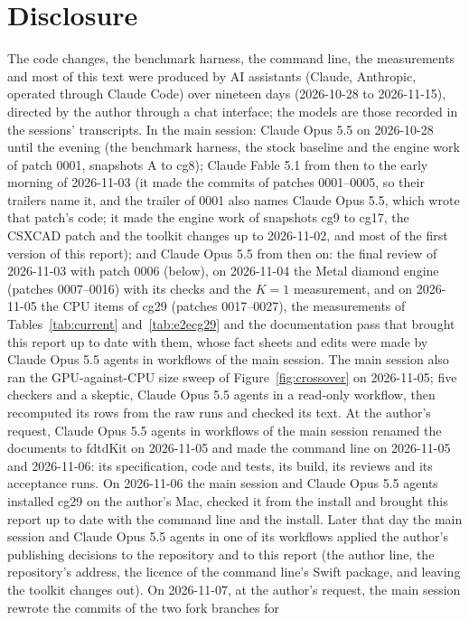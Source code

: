 \section{Disclosure}\label{sec:disclosure}
The code changes, the benchmark harness, the command line, the measurements and most of this text were produced by AI
assistants (Claude, Anthropic, operated through Claude Code) over nineteen days (2026-10-28 to 2026-11-15), directed by
the author through a chat interface; the models are those recorded in the sessions' transcripts. In the main session:
Claude Opus 5.5 on 2026-10-28 until the evening (the benchmark harness, the stock baseline and the engine work of
patch 0001, snapshots A to cg8); Claude Fable 5.1 from then to the early morning of 2026-11-03 (it made the commits
of patches 0001--0005, so their trailers name it, and the trailer of 0001 also names Claude Opus 5.5, which wrote
that patch's code; it made the engine work of snapshots cg9 to cg17, the CSXCAD patch and the toolkit changes up to
2026-11-02, and most of the first version of this report);
and Claude Opus 5.5 from then on: the final review of 2026-11-03 with patch 0006 (below), on 2026-11-04 the Metal
diamond engine (patches 0007--0016) with its checks and the $K=1$ measurement, and on 2026-11-05 the CPU items of cg29
(patches 0017--0027), the measurements of Tables~\ref{tab:current} and~\ref{tab:e2ecg29} and the documentation pass
that brought this report up to date with them, whose fact sheets and edits were made by Claude Opus 5.5 agents in
workflows of the main session. The main session also ran the GPU-against-CPU size sweep of
Figure~\ref{fig:crossover} on 2026-11-05; five checkers and a skeptic, Claude Opus 5.5 agents in a read-only
workflow, then recomputed its rows from the raw runs and checked its text. At the author's request, Claude Opus 5.5
agents in workflows of the main session renamed the documents to fdtdKit on 2026-11-05 and made the command line
 on 2026-11-05 and 2026-11-06: its specification, code and tests, its build, its reviews and its
acceptance runs. On 2026-11-06 the main session and Claude Opus 5.5 agents installed cg29 on the author's Mac,
checked it from the install and brought this report up to date with the command line and the install. Later that
day the main session and Claude Opus 5.5 agents in one of its workflows applied the author's publishing decisions to
the repository and to this report (the author line, the repository's address, the licence of the command line's
Swift package, and leaving the toolkit changes out).
On 2026-11-07, at the author's request, the main session rewrote the commits of the two fork branches for
